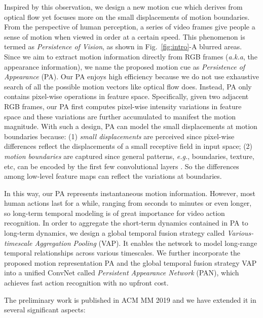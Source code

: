 \documentclass[journal]{IEEEtran}
\begin{document}
Inspired by this observation, we design a new motion cue which derives from optical flow yet focuses more on the small displacements of motion boundaries. From the perspective of human perception, a series of video frames give people a sense of motion when viewed in order at a certain speed. This phenomenon is termed as \emph{Persistence of Vision}, as shown in Fig.~\ref{fig:intro}-A blurred areas. Since we aim to extract motion information directly from RGB frames (\emph{a.k.a}, the appearance information), we name the proposed motion cue as \emph{Persistence of Appearance} (PA). Our PA enjoys high efficiency because we do not use exhaustive search of all the possible motion vectors like optical flow does. Instead, PA only contains pixel-wise operations in feature space. Specifically, given two adjacent RGB frames, our PA first computes pixel-wise intensity variations in feature space and these variations are further accumulated to manifest the motion magnitude. With such a design, PA can model the small displacements at motion boundaries because: (1) \emph{small displacements} are perceived since pixel-wise differences reflect the displacements of a small receptive field in input space; (2) \emph{motion boundaries} are captured since general patterns, \emph{e.g.}, boundaries, texture, etc, can be encoded by the first few convolutional layers \cite{zeiler2014visualizing}. So the differences among low-level feature maps can reflect the variations at boundaries.







In this way, our PA represents instantaneous motion information. However, most human actions last for a while, ranging from seconds to minutes or even longer, so long-term temporal modeling is of great importance for video action recognition. In order to aggregate the short-term dynamics contained in PA to long-term dynamics, we design a global temporal fusion strategy called \emph{Various-timescale Aggregation Pooling} (VAP). It enables the network to model long-range temporal relationships across various timescales. We further incorporate the proposed motion representation PA and the global temporal fusion strategy VAP into a unified ConvNet called \emph{Persistent Appearance Network} (PAN), which achieves fast action recognition with no upfront cost.

The preliminary work is published in ACM MM 2019 \cite{Zhang2019PANPA} and we have extended it in several significant aspects: 
\end{document}
